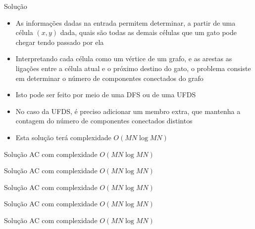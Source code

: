 \begin{frame}[fragile]{Solução}

    \begin{itemize}
        \item As informações dadas na entrada permitem determinar, a partir de uma célula
            $(x, y)$ dada, quais são todas as demais células que um gato pode chegar tendo
            passado por ela

        \item Interpretando cada célula como um vértice de um grafo, e as arestas as ligações
            entre a célula atual e o próximo destino do gato, o problema consiste em determinar
            o número de componentes conectados do grafo

        \item Isto pode ser feito por meio de uma DFS ou de uma UFDS

        \item No caso da UFDS, é preciso adicionar um membro extra, que mantenha a contagem
            do número de componentes conectados distintos

        \item Esta solução terá complexidade $O(MN\log MN)$
    \end{itemize}

\end{frame}

\begin{frame}[fragile]{Solução AC com complexidade $O(MN\log MN)$}
\end{frame}

\begin{frame}[fragile]{Solução AC com complexidade $O(MN\log MN)$}
\end{frame}

\begin{frame}[fragile]{Solução AC com complexidade $O(MN\log MN)$}
\end{frame}

\begin{frame}[fragile]{Solução AC com complexidade $O(MN\log MN)$}
\end{frame}

\begin{frame}[fragile]{Solução AC com complexidade $O(MN\log MN)$}
\end{frame}
